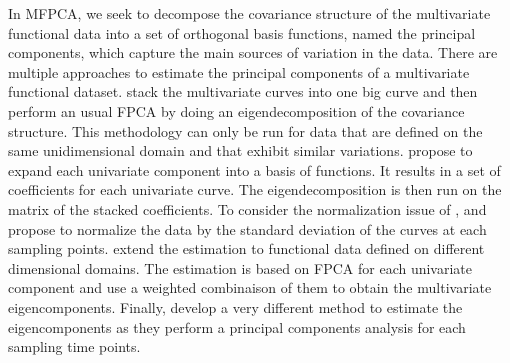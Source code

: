 In MFPCA, we seek to decompose the covariance structure of the multivariate functional data into a set of orthogonal basis functions, named the principal components, which capture the main sources of variation in the data. There are multiple approaches to estimate the principal components of a multivariate functional dataset. \cite{ramsayFunctionalDataAnalysis2005} stack the multivariate curves into one big curve and then perform an usual FPCA by doing an eigendecomposition of the covariance structure. This methodology can only be run for data that are defined on the same unidimensional domain and that exhibit similar variations. \cite{jacquesModelbasedClusteringMultivariate2014a} propose to expand each univariate component into a basis of functions. It results in a set of coefficients for each univariate curve. The eigendecomposition is then run on the matrix of the stacked coefficients. To consider the normalization issue of \cite{ramsayFunctionalDataAnalysis2005}, \cite{jacquesModelbasedClusteringMultivariate2014a} and \cite{chiouMultivariateFunctionalPrincipal2014} propose to normalize the data by the standard deviation of the curves at each sampling points. \cite{happMultivariateFunctionalPrincipal2015} extend the estimation to functional data defined on different dimensional domains. The estimation is based on FPCA for each univariate component and use a weighted combinaison of them to obtain the multivariate eigencomponents. Finally, \cite{berrenderoPrincipalComponentsMultivariate2011} develop a very different method to estimate the eigencomponents as they perform a principal components analysis for each sampling time points.

